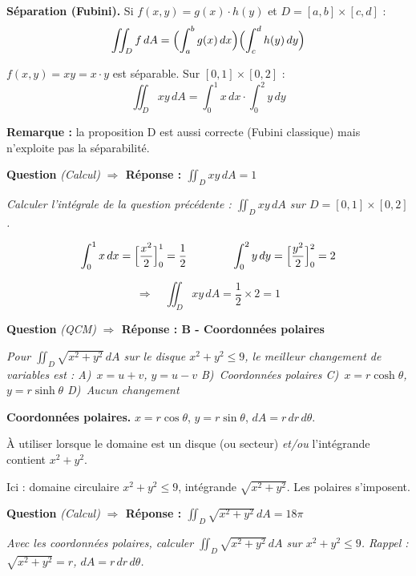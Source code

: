 \documentclass[11pt,a4paper]{article}
\newcounter{qnum}
\newcommand{\qtitre}[2]{%
  \stepcounter{qnum}%
  \medskip\noindent
  \textbf{\color{bleutexte}Question \theqnum}\enspace
  \textit{(#1)}\enspace
  \textcolor{vertok}{\textbf{$\Rightarrow$ Réponse : #2}}
  \par\smallskip
}
\newcommand{\qenonce}[1]{%
  \begin{mdframed}[backgroundcolor=grisbox, linewidth=0pt,
    innerleftmargin=8pt, innerrightmargin=8pt,
    innertopmargin=5pt, innerbottommargin=5pt,
    skipabove=2pt, skipbelow=4pt]
  \small\textit{#1}
  \end{mdframed}
}
\begin{document}
\begin{methodebox}
\textbf{Séparation (Fubini).} Si $f(x,y) = g(x)\cdot h(y)$ et $D = [a,b]\times[c,d]$ :
$$\iint_D f\,dA = \Bigl(\int_a^b g(x)\,dx\Bigr)\Bigl(\int_c^d h(y)\,dy\Bigr)$$
\end{methodebox}

$f(x,y) = xy = x \cdot y$ est séparable. Sur $[0,1]\times[0,2]$ :
$$\iint_D xy\,dA = \int_0^1 x\,dx \cdot \int_0^2 y\,dy$$

\textbf{Remarque :} la proposition D est aussi correcte (Fubini classique) mais n'exploite pas la séparabilité.

\qtitre{Calcul}{$\displaystyle\iint_D xy\,dA = 1$}
\qenonce{Calculer l'intégrale de la question précédente : $\displaystyle\iint_D xy\,dA$ sur $D=[0,1]\times[0,2]$.}

\begin{reponsebox}
$$\int_0^1 x\,dx = \Bigl[\frac{x^2}{2}\Bigr]_0^1 = \frac{1}{2}
\qquad\qquad
\int_0^2 y\,dy = \Bigl[\frac{y^2}{2}\Bigr]_0^2 = 2$$

$$\Rightarrow\quad \iint_D xy\,dA = \frac{1}{2}\times 2 = \boxed{1}$$
\end{reponsebox}

\qtitre{QCM}{B - Coordonnées polaires}
\qenonce{Pour $\iint_D\sqrt{x^2+y^2}\,dA$ sur le disque $x^2+y^2\leq 9$, le meilleur changement de variables est :
\quad A)~$x=u+v$, $y=u-v$ \quad B)~Coordonnées polaires \quad C)~$x=r\cosh\theta$, $y=r\sinh\theta$ \quad D)~Aucun changement}

\begin{methodebox}
\textbf{Coordonnées polaires.} $x = r\cos\theta$,\; $y = r\sin\theta$,\; $dA = r\,dr\,d\theta$.

À utiliser lorsque le domaine est un disque (ou secteur) \emph{et/ou} l'intégrande contient $x^2 + y^2$.
\end{methodebox}

Ici : domaine circulaire $x^2+y^2\leq 9$, intégrande $\sqrt{x^2+y^2}$. Les polaires s'imposent.

\qtitre{Calcul}{$\displaystyle\iint_D\sqrt{x^2+y^2}\,dA = 18\pi$}
\qenonce{Avec les coordonnées polaires, calculer $\iint_D\sqrt{x^2+y^2}\,dA$ sur $x^2+y^2\leq 9$. \textit{Rappel :} $\sqrt{x^2+y^2}=r$, $dA = r\,dr\,d\theta$.}
\end{document}
